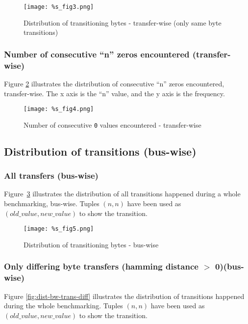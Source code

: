 \documentclass[a4paper,12pt]{article}
\begin{document}
{{{{{{{{{{{{{{{{{{{\begin{figure}[H]
		\centering
		\texttt{[image: \%s\_fig3.png]}
		\caption{Distribution of transitioning bytes - 
                  transfer-wise (only same byte transitions)}
		\label{fig:dist-tw-trans-same}
\end{figure}	

\pagebreak
\subsubsection{Number of consecutive ``n'' zeros encountered (transfer-wise)}
Figure \ref{fig:consec-zeros-tw} illustrates the distribution of
consecutive ``n'' zeros encountered, transfer-wise. The x axis is
the ``n'' value, and the y axis is the frequency.

\begin{figure}[H]
		\centering
		\texttt{[image: \%s\_fig4.png]}
		\caption{Number of consecutive \texttt{0} values encountered - 
                  transfer-wise}
		\label{fig:consec-zeros-tw}
\end{figure}






\pagebreak
\subsection{Distribution of transitions (bus-wise)}
\subsubsection{All transfers (bus-wise)}
Figure~\ref{fig:dist-bw-trans} illustrates the distribution of all 
transitions happened during a whole benchmarking, bus-wise. Tuples $(n,n)$ 
have been used as $(old\_value, new\_value)$ to show the transition.

\begin{figure}[H]
		\centering
		\texttt{[image: \%s\_fig5.png]}
		\caption{Distribution of transitioning bytes - bus-wise}
		\label{fig:dist-bw-trans}
\end{figure}	

\pagebreak
\subsubsection{Only differing byte transfers (hamming distance $>$ 0)(bus-wise)}
Figure \ref{fig:dist-bw-trans-diff} illustrates the distribution of 
transitions happened during the whole benchmarking. Tuples $(n,n)$ 
have been used as $(old\_value, new\_value)$ to show the transition.

}}}}}}}}}}}}}}}}}}}
\end{document}
